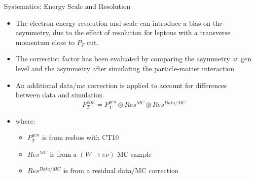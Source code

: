 \documentclass[t, 8pt]{beamer}
\begin{document}
\begin{frame}{Systematics: Energy Scale and Resolution}
    \begin{itemize}
      \item The electron energy resolution and scale can introduce a bias on the
      asymmetry, due to the effect of resolution for leptons with a transverse
      momentum close to $P_T$ cut.
      \item The correction factor has been evaluated by comparing the asymmetry at gen level and the asymmetry after simulating the particle-matter interaction
      \item An additional data/mc correction is applied to account for differences between data and simulation
      \begin{equation}
      P_T^{sim} = P_T^{gen} \otimes Res^{MC} \otimes Res^{Data/MC}
      \end{equation}
      \item where:
      \begin{itemize} 
        \item $P_T^{gen}$ is from resbos with CT10
        \item $Res^{MC}$ is from a $(W\to e\nu)$ MC sample
        \item $Res^{Data/MC}$ is from a residual data/MC correction 
      \end{itemize}
    \end{itemize}
\end{frame}
\end{document}

